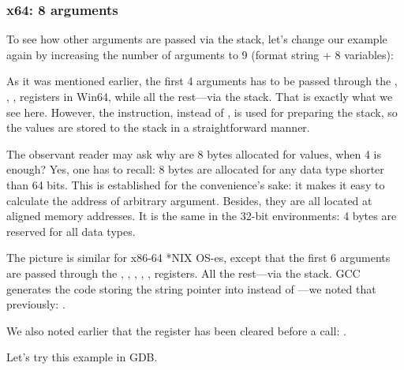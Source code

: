 \subsubsection{x64: 8 arguments}

\label{example_printf8_x64}
To see how other arguments are passed via the stack, let's change our example again 
by increasing the number of arguments to 9 (\printf format string + 8 \Tint variables):




As it was mentioned earlier, the first 4 arguments has to be passed through the \RCX, \RDX, ,  registers in Win64, while all the rest---via the stack.
That is exactly what we see here.
However, the \MOV instruction, instead of \PUSH, is used for preparing the stack, so the values are stored to the stack in a straightforward manner.



The observant reader may ask why are 8 bytes allocated for \Tint values, when 4 is enough?
Yes, one has to recall: 8 bytes are allocated for any data type shorter than 64 bits.
This is established for the convenience's sake: it makes it easy to calculate the address of arbitrary argument.
Besides, they are all located at aligned memory addresses.
It is the same in the 32-bit environments: 4 bytes are reserved for all data types.



The picture is similar for x86-64 *NIX OS-es, except that the first 6 arguments are passed through the \RDI, \RSI,
\RDX, \RCX, ,  registers.
All the rest---via the stack.
GCC generates the code storing the string pointer into \EDI instead of \RDI{}---we noted that previously: 
.

We also noted earlier that the \EAX register has been cleared before a \printf call: .




Let's try this example in \ac{GDB}.

